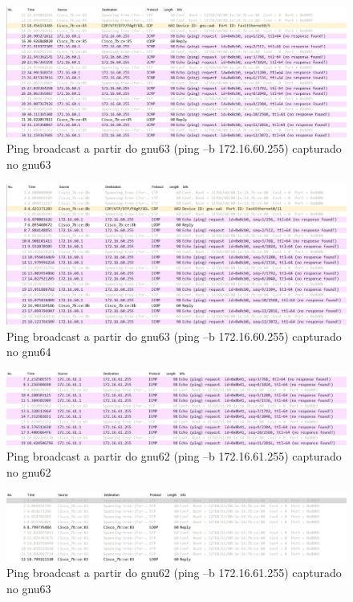 \documentclass[article, a4paper, 11pt, oneside]{memoir}
\begin{document}
\begin{figure}[h]
	\centering
\includegraphics[scale=0.55]{exp2-step8-broadcast-gnu63-from-gnu63.png}
\caption{Ping broadcast a partir do gnu63 (ping –b 172.16.60.255) capturado no gnu63}
\end{figure}

\newpage
\begin{figure}[h]
	\centering
\includegraphics[scale=0.55]{exp2-step8-broadcast-gnu63-from-gnu64.png}
\caption{Ping broadcast a partir do gnu63 (ping –b 172.16.60.255) capturado no gnu64}
\end{figure}

\begin{figure}[h]
	\centering
\includegraphics[scale=0.55]{exp2-step10-broadcast-gnu62-from-gnu62.png}
\caption{Ping broadcast a partir do gnu62 (ping –b 172.16.61.255) capturado no gnu62}
\end{figure}

\begin{figure}[h]
	\centering
\includegraphics[scale=0.55]{exp2-step10-broadcast-gnu62-from-gnu63.png}
\caption{Ping broadcast a partir do gnu62 (ping –b 172.16.61.255) capturado no gnu63}
\end{figure}
\end{document}
